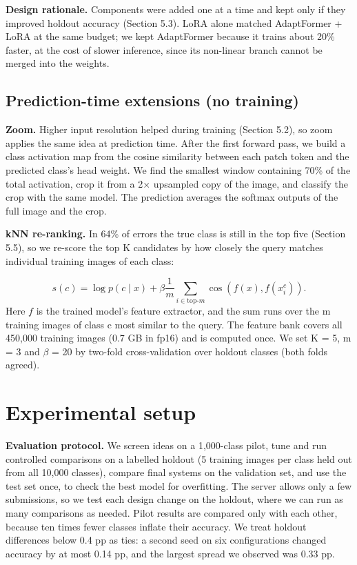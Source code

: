 \textbf{Design rationale.} Components were added one at a time and kept only if they improved holdout accuracy (Section 5.3). LoRA alone matched AdaptFormer + LoRA at the same budget; we kept AdaptFormer because it trains about 20\% faster, at the cost of slower inference, since its non-linear branch cannot be merged into the weights.

\subsection{Prediction-time extensions (no training)}\label{prediction-time-extensions-no-training}

\textbf{Zoom.} Higher input resolution helped during training (Section 5.2), so zoom applies the same idea at prediction time. After the first forward pass, we build a class activation map \citep{zhou2016cam} from the cosine similarity between each patch token and the predicted class's head weight. We find the smallest window containing 70\% of the total activation, crop it from a 2$\times$ upsampled copy of the image, and classify the crop with the same model. The prediction averages the softmax outputs of the full image and the crop.

\textbf{kNN re-ranking.} In 64\% of errors the true class is still in the top five (Section 5.5), so we re-score the top K candidates by how closely the query matches individual training images of each class:

\begin{equation}
s(c)=\log p(c\mid x)+\beta\frac{1}{m}\sum_{i\in\mathrm{top}\text{-}m}
\cos\!\left(f(x),f(x_i^c)\right).
\end{equation}
Here $f$ is the trained model's feature extractor, and the sum runs over the m training images of class c most similar to the query. The feature bank covers all 450,000 training images (0.7 GB in fp16) and is computed once. We set K = 5, m = 3 and $\beta$ = 20 by two-fold cross-validation over holdout classes (both folds agreed).

\section{Experimental setup}\label{experimental-setup}

\textbf{Evaluation protocol.} We screen ideas on a 1,000-class pilot, tune and run controlled comparisons on a labelled holdout (5 training images per class held out from all 10,000 classes), compare final systems on the validation set, and use the test set once, to check the best model for overfitting. The server allows only a few submissions, so we test each design change on the holdout, where we can run as many comparisons as needed. Pilot results are compared only with each other, because ten times fewer classes inflate their accuracy. We treat holdout differences below 0.4 pp as ties: a second seed on six configurations changed accuracy by at most 0.14 pp, and the largest spread we observed was 0.33 pp.

